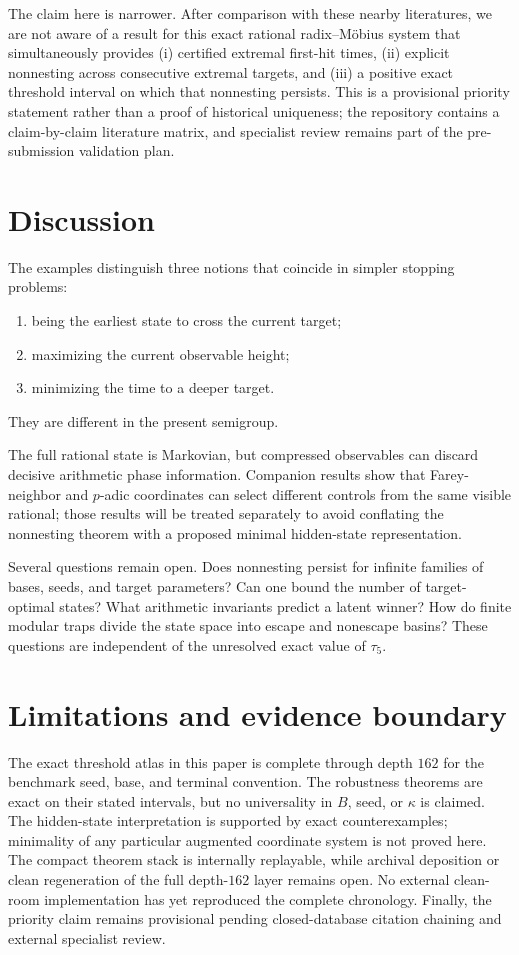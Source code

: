 \documentclass[11pt]{amsart}
\theoremstyle{definition}
\begin{document}
The claim here is narrower.  After comparison with these nearby literatures, we are not aware of a result for this exact rational radix--M\"obius system that simultaneously provides (i) certified extremal first-hit times, (ii) explicit nonnesting across consecutive extremal targets, and (iii) a positive exact threshold interval on which that nonnesting persists.  This is a provisional priority statement rather than a proof of historical uniqueness; the repository contains a claim-by-claim literature matrix, and specialist review remains part of the pre-submission validation plan.

\section{Discussion}

The examples distinguish three notions that coincide in simpler stopping problems:
\begin{enumerate}
\item being the earliest state to cross the current target;
\item maximizing the current observable height;
\item minimizing the time to a deeper target.
\end{enumerate}
They are different in the present semigroup.

The full rational state is Markovian, but compressed observables can discard decisive arithmetic phase information.  Companion results show that Farey-neighbor and $p$-adic coordinates can select different controls from the same visible rational; those results will be treated separately to avoid conflating the nonnesting theorem with a proposed minimal hidden-state representation.

Several questions remain open.  Does nonnesting persist for infinite families of bases, seeds, and target parameters?  Can one bound the number of target-optimal states?  What arithmetic invariants predict a latent winner?  How do finite modular traps divide the state space into escape and nonescape basins?  These questions are independent of the unresolved exact value of $\tau_5$.

\section{Limitations and evidence boundary}

The exact threshold atlas in this paper is complete through depth $162$ for the benchmark seed, base, and terminal convention.  The robustness theorems are exact on their stated intervals, but no universality in $B$, seed, or $\kappa$ is claimed.  The hidden-state interpretation is supported by exact counterexamples; minimality of any particular augmented coordinate system is not proved here.  The compact theorem stack is internally replayable, while archival deposition or clean regeneration of the full depth-$162$ layer remains open.  No external clean-room implementation has yet reproduced the complete chronology.  Finally, the priority claim remains provisional pending closed-database citation chaining and external specialist review.
\end{document}
